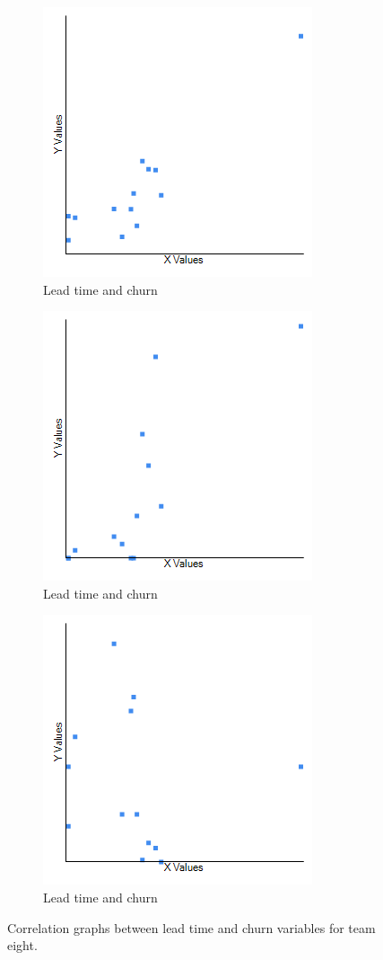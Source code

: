 \documentclass[UKenglish]{ifimaster}  %
\begin{document}
\begin{figure}[h] 
  \begin{subfigure}[b]{0.3\textwidth}
\includegraphics[scale=0.5]{Picture/Eight/LTvsChurn.png}
 \caption{Lead time and churn} 
 \label{fig:a:lt:8}
  \end{subfigure}
  \begin{subfigure}[b]{0.3\textwidth}
\includegraphics[scale=0.5]{Picture/Eight/LTvsChurnFT.png}
 \caption{Lead time and churn} 
\label{fig:b:lt:8}
  \end{subfigure}
  \begin{subfigure}[b]{0.3\textwidth}
\includegraphics[scale=0.5]{Picture/Eight/LTvsChurnB.png}
  \caption{Lead time and churn} 
\label{fig:c:lt:8}
  \end{subfigure}
\caption{Correlation graphs between lead time and churn variables for team eight.}
\label{corr:Difference:lt:8}
\end{figure}
\end{document}

